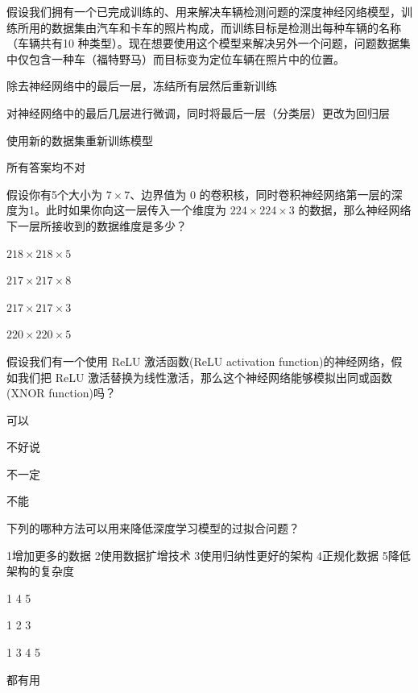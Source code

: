 \documentclass{exam-zh}
\begin{document}
\begin{question}
	假设我们拥有一个已完成训练的、用来解决车辆检测问题的深度神经冈络模型，训练所用的数据集由汽车和卡车的照片构成，而训练目标是检测出每种车辆的名称（车辆共有10 种类型）。现在想要使用这个模型来解决另外一个问题，问题数据集中仅包含一种车（福特野马）而目标变为定位车辆在照片中的位置。\paren[B]
	\begin{choices}
		\item 除去神经网络中的最后一层，冻结所有层然后重新训练
		\item 对神经网络中的最后几层进行微调，同时将最后一层（分类层）更改为回归层
		\item 使用新的数据集重新训练模型
		\item 所有答案均不对
	\end{choices}
\end{question}

\begin{question}
	假设你有5个大小为 $7 \times 7$、边界值为 0 的卷积核，同时卷积神经网络第一层的深度为1。此时如果你向这一层传入一个维度为 $224 \times 224 \times 3$ 的数据，那么神经网络下一层所接收到的数据维度是多少？\paren[A]
	\begin{choices}
		\item $218 \times 218 \times 5$
		\item $217 \times 217 \times 8$
		\item $217 \times 217 \times 3$
		\item $220 \times 220 \times 5$
	\end{choices}
\end{question}

\begin{question}
	假设我们有一个使用 ReLU 激活函数(ReLU activation function)的神经网络，假如我们把 ReLU 激活替换为线性激活，那么这个神经网络能够模拟出同或函数(XNOR function)吗？\paren[D]
	\begin{choices}
		\item 可以
		\item 不好说
		\item 不一定
		\item 不能
	\end{choices}
\end{question}

\begin{question}
	下列的哪种方法可以用来降低深度学习模型的过拟合问题？
	
	1增加更多的数据 2使用数据扩增技术 3使用归纳性更好的架构 4正规化数据 5降低架构的复杂度\paren[D]
	\begin{choices}
		\item 1 4 5
		\item 1 2 3
		\item 1 3 4 5
		\item 都有用
	\end{choices}
\end{question}
\end{document}
